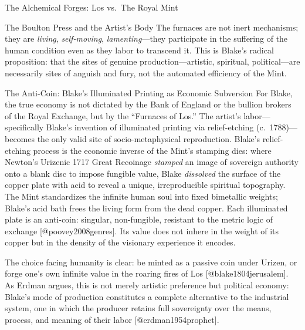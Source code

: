 \documentclass[
  ignorenonframetext,
]{beamer}
\begin{document}
\begin{frame}{The Alchemical Forges: Los vs.~The Royal Mint}
\begin{block}{The Boulton Press and the Artist's Body}
The furnaces are not inert mechanisms; they are \emph{living},
\emph{self-moving}, \emph{lamenting}---they participate in the suffering
of the human condition even as they labor to transcend it. This is
Blake's radical proposition: that the sites of genuine
production---artistic, spiritual, political---are necessarily sites of
anguish and fury, not the automated efficiency of the Mint.
\end{block}

\begin{block}{The Anti-Coin: Blake's Illuminated Printing as Economic
Subversion}
\protect{}\label{the-anti-coin-blakes-illuminated-printing-as-economic-subversion}
For Blake, the true economy is not dictated by the Bank of England or
the bullion brokers of the Royal Exchange, but by the ``Furnaces of
Los.'' The artist's labor---specifically Blake's invention of
illuminated printing via relief-etching (c.~1788)---becomes the only
valid site of socio-metaphysical reproduction. Blake's relief-etching
process is the economic inverse of the Mint's stamping dies: where
Newton's Urizenic 1717 Great Recoinage \emph{stamped} an image of
sovereign authority onto a blank disc to impose fungible value, Blake
\emph{dissolved} the surface of the copper plate with acid to reveal a
unique, irreproducible spiritual topography. The Mint standardizes the
infinite human soul into fixed bimetallic weights; Blake's acid bath
frees the living form from the dead copper. Each illuminated plate is an
anti-coin: singular, non-fungible, resistant to the metric logic of
exchange {[}@poovey2008genres{]}. Its value does not inhere in the
weight of its copper but in the density of the visionary experience it
encodes.

The choice facing humanity is clear: be minted as a passive coin under
Urizen, or forge one's own infinite value in the roaring fires of Los
{[}@blake1804jerusalem{]}. As Erdman argues, this is not merely artistic
preference but political economy: Blake's mode of production constitutes
a complete alternative to the industrial system, one in which the
producer retains full sovereignty over the means, process, and meaning
of their labor {[}@erdman1954prophet{]}.
\end{block}
\end{frame}
\end{document}
